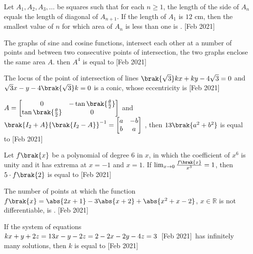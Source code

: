 \iffalse
  \title{Assignment}
  \author{EE24BTECH11044}
  \section{integer}
\fi 
        \item Let $A_1,A_2,A_3,\dots$ be squares such that for each $n\geq1$, the length of the side of $A_n$ equals the length of diagonal of $A_{n+1}$. If the length of $A_1$ is $12$ cm, then the smallest value of $n$ for which area of $A_n$ is less than one is . \hfill{[Feb 2021]}

	\item The graphs of sine and cosine functions, intersect each other at a number of points and between two consecutive points of intersection, the two graphs enclose the same area $A$. then $A^4$ is equal to  \hfill{[Feb 2021]}

	\item The locus of the point of intersection of lines $\brak{\sqrt{3}}kx+ky-4\sqrt{3}= 0$ and $\sqrt{3}x-y-4\brak{\sqrt{3}}k=0$ is a conic, whose eccentricity is  \hfill{[Feb 2021]}

	\item $A=\begin{bmatrix}
			0 & -\tan{\brak{\frac{\theta}{2}}}\\
			\tan{\brak{\frac{\theta}{2}}} & 0
	\end{bmatrix}$ and $\brak{I_2+A}{\brak{I_2-A}}^{-1}= \begin{bmatrix}
		a & -b\\
		b & a
	\end{bmatrix}$
		, then $13\brak{a^2+b^2}$ is equal to  \hfill{[Feb 2021]}
		
	\item Let $f\brak{x}$ be a polynomial of degree $6$ in $x$, in which the coefficient of $x^6$ is unity and it has extrema at $x=-1$ and $x=1$. If $\lim_{x\to 0} \frac{f\brak{x}}{x^3}=1$, then $5\cdot f\brak{2}$ is equal to  \hfill{[Feb 2021]}

	\item The number of points at which the function $f\brak{x}=\abs{2x+1}-3\abs{x+2}+\abs{x^2+x-2}$, $x\in\mathbb{R}$ is not differentiable, is . \hfill{[Feb 2021]}
		
	\item If the system of equations \\
		$kx+y+2z=1\\
		3x-y-2z=2\\
		-2x-2y-4z=3$\ \hfill{[Feb 2021]}\
		has infinitely many solutions, then $k$ is equal to  \hfill{[Feb 2021]}

